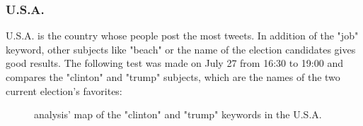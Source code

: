 \documentclass[a4paper,11pt]{report}
\begin{document}
\subsubsection{U.S.A.}
U.S.A. is the country whose people post the most tweets. In addition of the "job" keyword, other subjects like "beach" or the name of the election candidates gives good results. The following test was made on July 27 from 16:30 to 19:00 and compares the "clinton" and "trump" subjects, which are the names of the two current election's favorites:\\
\begin{figure}[H]
\vspace{-5pt}
\begin{center}
\vspace{-20pt}
\caption{analysis' map of the "clinton" and "trump" keywords in the U.S.A.}
\end{center}
\end{figure}
\vspace{-10pt}
\end{document}
